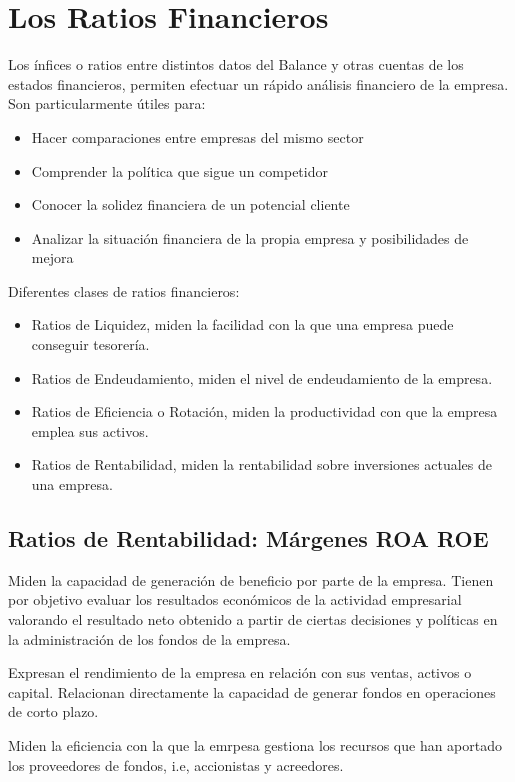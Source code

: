 \chapter{Los Ratios Financieros}
Los ínfices o ratios entre distintos datos del Balance y otras cuentas de los estados financieros, permiten efectuar un rápido análisis financiero de la empresa. Son particularmente útiles para:
\begin{itemize}
    \item Hacer comparaciones entre empresas del mismo sector
    \item Comprender la política que sigue un competidor
    \item Conocer la solidez financiera de un potencial cliente
    \item Analizar la situación financiera de la propia empresa y posibilidades de mejora
\end{itemize}

Diferentes clases de ratios financieros:
\begin{itemize}
    \item Ratios de Liquidez, miden la facilidad con la que una empresa puede conseguir tesorería.
    \item Ratios de Endeudamiento, miden el nivel de endeudamiento de la empresa.
    \item Ratios de Eficiencia o Rotación, miden la productividad con que la empresa emplea sus activos.
    \item Ratios de Rentabilidad, miden la rentabilidad sobre inversiones actuales de una empresa.
\end{itemize}

\section{Ratios de Rentabilidad: Márgenes ROA ROE}
Miden la capacidad de generación de beneficio por parte de la empresa. Tienen por objetivo evaluar los resultados económicos de la actividad empresarial valorando el resultado neto obtenido a partir de ciertas decisiones y políticas en la administración de los fondos de la empresa.

Expresan el rendimiento de la empresa en relación con sus ventas, activos o capital. Relacionan directamente la capacidad de generar fondos en operaciones de corto plazo.

Miden la eficiencia con la que la emrpesa gestiona los recursos que han aportado los proveedores de fondos, i.e, accionistas y acreedores.

